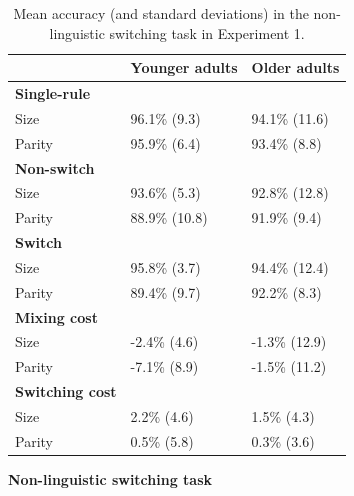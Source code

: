\documentclass[
]{article}
\begin{document}
\newpage

\begin{table}[H]

\caption{\label{tab:TableS3}Mean accuracy (and standard deviations) in the non-linguistic switching task in Experiment 1.}
\centering
\begin{tabular}[t]{lll}
\toprule
\textbf{} & \textbf{Younger adults} & \textbf{Older adults}\\
\midrule
\textbf{Single-rule} & \textbf{} & \textbf{}\\
Size & 96.1\% (9.3) & 94.1\% (11.6)\\
Parity & 95.9\% (6.4) & 93.4\% (8.8)\\
\textbf{Non-switch} & \textbf{} & \textbf{}\\
Size & 93.6\% (5.3) & 92.8\% (12.8)\\
\addlinespace
Parity & 88.9\% (10.8) & 91.9\% (9.4)\\
\textbf{Switch} & \textbf{} & \textbf{}\\
Size & 95.8\% (3.7) & 94.4\% (12.4)\\
Parity & 89.4\% (9.7) & 92.2\% (8.3)\\
\textbf{Mixing cost} & \textbf{} & \textbf{}\\
\addlinespace
Size & -2.4\% (4.6) & -1.3\% (12.9)\\
Parity & -7.1\% (8.9) & -1.5\% (11.2)\\
\textbf{Switching cost} & \textbf{} & \textbf{}\\
Size & 2.2\% (4.6) & 1.5\% (4.3)\\
Parity & 0.5\% (5.8) & 0.3\% (3.6)\\
\bottomrule
\end{tabular}
\end{table}

\newpage

\textbf{Non-linguistic switching task}
\end{document}
